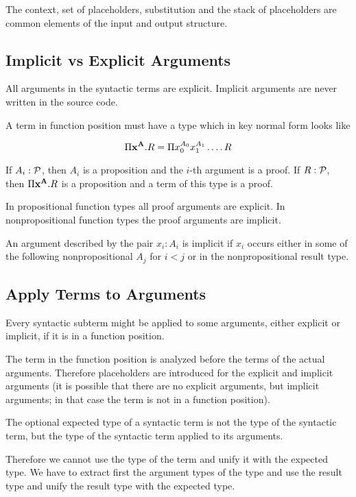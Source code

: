 The context, set of placeholders, substitution and the stack of placeholders
are common elements of the input and output structure.




\subsection{Implicit vs Explicit Arguments}

All arguments in the syntactic terms are explicit. Implicit arguments are
never written in the source code.

A term in function position must have a type which in key normal form looks
like

$$
\Pi \mathbf{x}^{\mathbf{A}} . R = \Pi x_0^{A_0} x_1^{A_1} \ldots .\, R
$$

If $A_i:{\cal{P}}$, then $A_i$ is a proposition and the $i$-th argument is a
proof. If $R:{\cal{P}}$, then $\Pi \mathbf{x}^{\mathbf{A}}. R$ is a proposition and a term
of this type is a proof.

In propositional function types all proof arguments are explicit. In
nonpropositional function types the proof arguments are implicit.

An argument described by the pair $x_i: A_i$ is implicit if $x_i$ occurs
either in some of the following nonpropositional $A_j$ for $i < j$ or in the
nonpropositional result type.





\subsection{Apply Terms to Arguments}

Every syntactic subterm might be applied to some arguments, either explicit or
implicit, if it is in a function position.

The term in the function position is analyzed before the terms of the actual
arguments. Therefore placeholders are introduced for the explicit and implicit
arguments (it is possible that there are no explicit arguments, but implicit
arguments; in that case the term is not in a function position).

The optional expected type of a syntactic term is not the type of the
syntactic term, but the type of the syntactic term applied to its arguments.

Therefore we cannot use the type of the term and unify it with the expected
type. We have to extract first the argument types of the type and use the
result type and unify the result type with the expected type.

